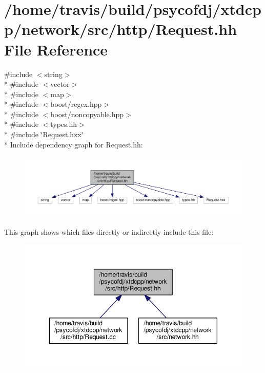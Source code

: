 \hypertarget{Request_8hh}{\section{/home/travis/build/psycofdj/xtdcpp/network/src/http/\-Request.hh File Reference}
\label{Request_8hh}
}
{\ttfamily \#include $<$string$>$}\\*
{\ttfamily \#include $<$vector$>$}\\*
{\ttfamily \#include $<$map$>$}\\*
{\ttfamily \#include $<$boost/regex.\-hpp$>$}\\*
{\ttfamily \#include $<$boost/noncopyable.\-hpp$>$}\\*
{\ttfamily \#include $<$types.\-hh$>$}\\*
{\ttfamily \#include \char`\"{}Request.\-hxx\char`\"{}}\\*
Include dependency graph for Request.\-hh\-:
\nopagebreak
\begin{figure}[H]
\begin{center}
\leavevmode
\includegraphics[width=350pt]{Request_8hh__incl}
\end{center}
\end{figure}
This graph shows which files directly or indirectly include this file\-:
\nopagebreak
\begin{figure}[H]
\begin{center}
\leavevmode
\includegraphics[width=350pt]{Request_8hh__dep__incl}
\end{center}
\end{figure}

